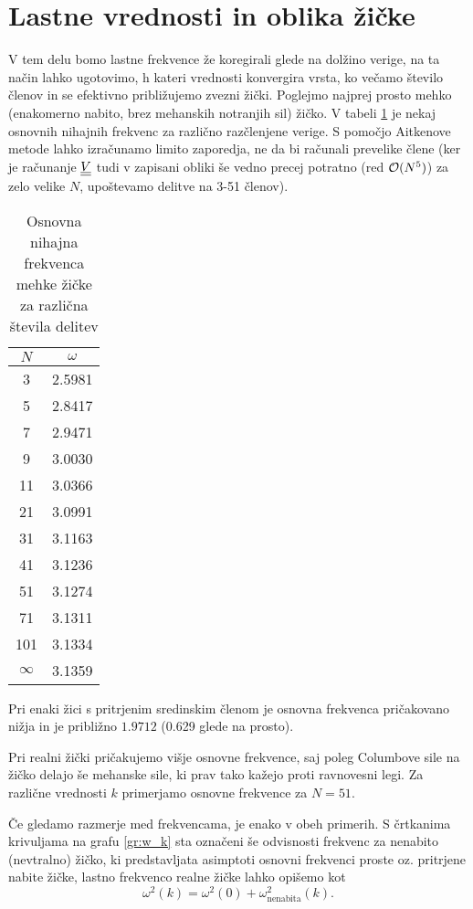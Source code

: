 \documentclass{article}
\begin{document}
\section{Lastne vrednosti in oblika žičke}
V tem delu bomo lastne frekvence že koregirali glede na dolžino verige, na ta način lahko ugotovimo, h kateri vrednosti konvergira vrsta, ko večamo število členov in se efektivno približujemo zvezni žički. Poglejmo najprej prosto mehko (enakomerno nabito, brez mehanskih notranjih sil) žičko. V tabeli \ref{tab:konv1} je nekaj osnovnih nihajnih frekvenc za različno razčlenjene verige. S pomočjo Aitkenove metode lahko izračunamo limito zaporedja, ne da bi računali prevelike člene (ker je računanje $\underline{\underline{V}}$ tudi v zapisani obliki še vedno precej potratno (red $\operatorname{\mathcal{O}}(N^5)$) za zelo velike $N$, upoštevamo delitve na 3-51 členov).
\begin{table}[H]
    \centering
    \begin{tabular}{|c c|}
        \hline
        $N$ & $\omega$\\
        \hline
        3 & \num{2,5981}\\
        5 & \num{2,8417}\\
        7 & \num{2,9471}\\
        9 & \num{3,0030}\\
        11& \num{3,0366}\\
        21& \num{3,0991}\\
        31& \num{3,1163}\\
        41& \num{3,1236}\\
        51& \num{3,1274}\\
        71& \num{3,1311}\\
        101&\num{3,1334}\\
        \hline
        $\infty$ & \num{3,1359}\\
        \hline
    \end{tabular}
    \caption{Osnovna nihajna frekvenca mehke žičke za različna števila delitev}
    \label{tab:konv1}
\end{table}
\noindent Pri enaki žici s pritrjenim sredinskim členom je osnovna frekvenca pričakovano nižja in je približno $\num{1,9712}$ (\num{0,629} glede na prosto).

Pri realni žički pričakujemo višje osnovne frekvence, saj poleg Columbove sile na žičko delajo še mehanske sile, ki prav tako kažejo proti ravnovesni legi. Za različne vrednosti $k$ primerjamo osnovne frekvence za $N=51$.
\begin{graph}[H]
    \centering
    
    \caption{Odvisnost osnovne frekvence od trdnosti žičke}
    \label{gr:w_k}
\end{graph}
\noindent Če gledamo razmerje med frekvencama, je enako v obeh primerih. S črtkanima krivuljama na grafu \ref{gr:w_k} sta označeni še odvisnosti frekvenc za nenabito (nevtralno) žičko, ki predstavljata asimptoti osnovni frekvenci proste oz. pritrjene nabite žičke, lastno frekvenco realne žičke lahko opišemo kot
\begin{equation}
    \omega^2(k)=\omega^2(0)+\omega^2_\text{nenabita}(k).
\end{equation}
\end{document}
